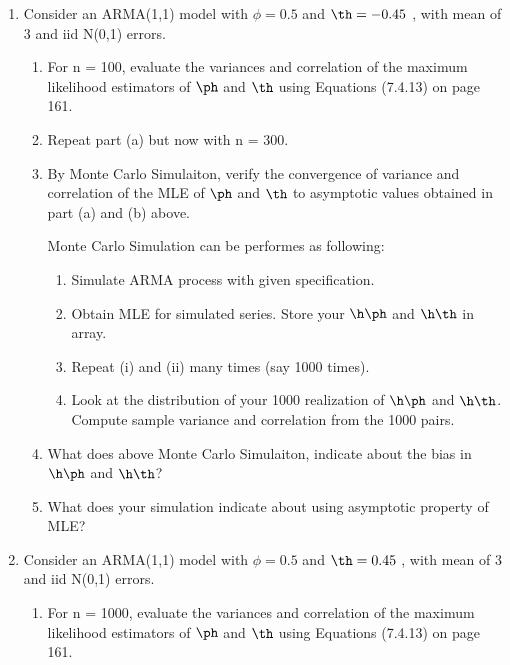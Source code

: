 \begin{enumerate}


\item 
Consider an ARMA(1,1) model with $\phi = 0.5$ and \textcolor{red}{ $\th = -0.45$ }, with 
mean of 3 and iid N(0,1) errors.  

\begin{enumerate} 
\item For n = 100, evaluate the variances and correlation of the maximum likelihood
estimators of $\ph$ and $\th$ using Equations (7.4.13) on page 161. 

\item Repeat part (a) but now with n = 300. 


\item By Monte Carlo Simulaiton, verify the convergence of variance and correlation of the 
MLE of $\ph$ and $\th$ to asymptotic values obtained in part (a) and (b) above. 

Monte Carlo Simulation can be performes as following:
\begin{enumerate} 
\item Simulate ARMA process with given specification. 
\item Obtain MLE for simulated series.  Store your $\h \ph$ and $\h \th$ 
in array. 
\item Repeat (i) and (ii) many times (say 1000 times).
\item Look at the distribution of your 1000 realization of $\h \ph$ and 
$\h \th$.  Compute sample variance and correlation from the 1000 pairs. 
\end{enumerate}

\item What does above Monte Carlo Simulaiton, indicate about the bias in 
$\h \ph$ and $\h \th$? 

\item What does your simulation indicate about using asymptotic property of 
MLE?

\end{enumerate}


\clearpage 
\item 
Consider an ARMA(1,1) model with $\phi = 0.5$ and \textcolor{red}{ $\th = 0.45$ }, with 
mean of 3 and iid N(0,1) errors.  

\begin{enumerate} 
\item For n = 1000, evaluate the variances and correlation of the maximum likelihood
estimators of $\ph$ and $\th$ using Equations (7.4.13) on page 161. 


\end{enumerate}
\end{enumerate}
